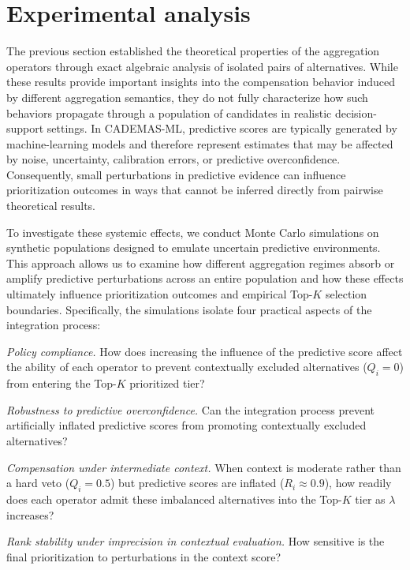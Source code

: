 \documentclass[mathematics,article,submit,moreauthors]{Definitions/mdpi}
\begin{document}
\section{Experimental analysis}\label{sect:simulation}

{\color{red}
The previous section established the theoretical properties of the aggregation operators through exact algebraic analysis of isolated pairs of alternatives. While these results provide important insights into the compensation behavior induced by different aggregation semantics, they do not fully characterize how such behaviors propagate through a population of candidates in realistic decision-support settings. In CADEMAS-ML, predictive scores are typically generated by machine-learning models and therefore represent estimates that may be affected by noise, uncertainty, calibration errors, or predictive overconfidence. Consequently, small perturbations in predictive evidence can influence prioritization outcomes in ways that cannot be inferred directly from pairwise theoretical results.

To investigate these systemic effects, we conduct Monte Carlo simulations on synthetic populations designed to emulate uncertain predictive environments. This approach allows us to examine how different aggregation regimes absorb or amplify predictive perturbations across an entire population and how these effects ultimately influence prioritization outcomes and empirical Top-$K$ selection boundaries. Specifically, the simulations isolate four practical aspects of the integration process:
}

\begin{enumerate}

\item \emph{Policy compliance.} How does increasing the influence of the predictive score affect the ability of each operator to prevent contextually excluded alternatives ($Q_i=0$) from entering the Top-$K$ prioritized tier?

\item \emph{Robustness to predictive overconfidence.} Can the integration process prevent artificially inflated predictive scores from promoting contextually excluded alternatives?

{\color{red}
\item \emph{Compensation under intermediate context.} When context is moderate rather than a hard veto ($Q_i=0.5$) but predictive scores are inflated ($R_i\approx 0.9$), how readily does each operator admit these imbalanced alternatives into the Top-$K$ tier as $\lambda$ increases?
}

\item \emph{Rank stability under imprecision in contextual evaluation.} How sensitive is the final prioritization to perturbations in the context score?

\end{enumerate}
\end{document}
